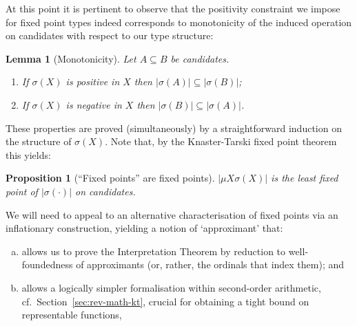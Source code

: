 \documentclass[10pt,a4paper]{amsart}
\theoremstyle{plain}
\newtheorem{proposition}[proposition]{Proposition}
\newtheorem{lemma}[lemma]{Lemma}
\theoremstyle{definition}
\renewcommand{\todo}[1]{}
\theoremstyle{plain}
\theoremstyle{definition} %
\newcommand{\hr}[1]{|#1|}
\begin{document}
At this point it is pertinent to observe that the positivity constraint we impose for fixed point types indeed corresponds to monotonicity of the induced operation on candidates with respect to our type structure:
\begin{lemma}
[Monotonicity]
\label{lem:mon-pos-types-in-hr}
Let $A\subseteq B$ be candidates.
\begin{enumerate}
    \item 
If $\sigma(X)$ is positive in $X$ then $\hr{\sigma(A)}\subseteq \hr{\sigma(B)}$; 
\item If $\sigma(X)$ is negative in $X$ then $\hr{\sigma(B)}\subseteq \hr{\sigma(A)}$.
\end{enumerate}
\end{lemma}
These properties are proved (simultaneously) by a straightforward induction on the structure of $\sigma(X)$. \todo{give proof?}
Note that, by the Knaster-Tarski fixed point theorem this yields:
\begin{proposition}
[``Fixed points'' are fixed points]
\label{prop:hr-mu-is-lfp}
    $\hr{\mu X \sigma(X)}$ is the least fixed point of $\hr{\sigma(\cdot)}$ on candidates.
\end{proposition}

We will need to appeal to an alternative characterisation of fixed points via an inflationary construction, yielding a notion of `approximant' that:
\begin{enumerate}[(a)]
    \item allows us to prove the Interpretation Theorem by reduction to well-foundedness of approximants (or, rather, the ordinals that index them); and 
    \item allows a logically simpler formalisation within second-order arithmetic, cf.~Section~\ref{sec:rev-math-kt}, crucial for obtaining a tight bound on representable functions,
\end{enumerate}
\end{document}
